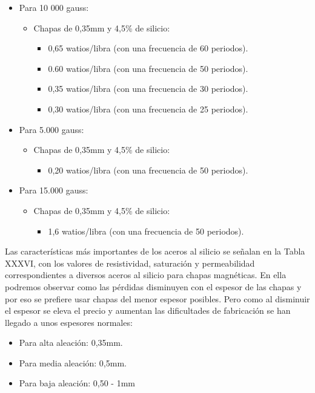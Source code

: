 \documentclass[12pt,a4paper]{article}
\begin{document}
\begin{itemize}
    \item Para 10 000 gauss: 
    \begin{itemize}
        \item Chapas de 0,35mm y 4,5\% de silicio: 
        \begin{itemize}
        \item 0,65 watios/libra (con una frecuencia de 60 periodos).
        \item 0.60 watios/libra (con una frecuencia de 50 periodos).
        \item 0,35 watios/libra (con una frecuencia de 30 periodos).
        \item 0,30 watios/libra (con una frecuencia de 25 periodos).
        \end{itemize}
    \end{itemize}
\item Para 5.000 gauss: 
    \begin{itemize}
        \item Chapas de 0,35mm y 4,5\% de silicio:
        \begin{itemize}
            \item 0,20 watios/libra (con una frecuencia de 50 periodos).
        \end{itemize}
    \end{itemize}
\item Para 15.000 gauss:
    \begin{itemize}
        \item Chapas de 0,35mm y 4,5\% de silicio:
        \begin{itemize}
            \item 1,6 watios/libra (con una frecuencia de 50 periodos).
        \end{itemize}
    \end{itemize}
\end{itemize}

Las características más importantes de los aceros al silicio se señalan en la Tabla XXXVI, con los valores de resistividad, saturación y permeabilidad correspondientes a diversos aceros al silicio para chapas magnéticas. En ella podremos observar como las pérdidas disminuyen con el espesor de las chapas y por eso se prefiere usar chapas del menor espesor posibles. Pero como al disminuir el espesor se eleva el precio y aumentan las dificultades de fabricación se han llegado a unos espesores normales:

\begin{itemize}
    \item Para alta aleación: 0,35mm.
    \item Para media aleación: 0,5mm.
    \item Para baja aleación: 0,50 - 1mm
\end{itemize}
\end{document}
